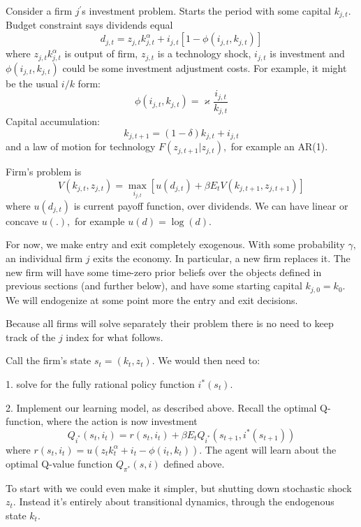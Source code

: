 \documentclass[12pt]{article}%
\begin{document}
Consider a firm $j^{\prime}$s investment problem. Starts the period with some
capital $k_{j,t}.$ Budget constraint says dividends equal
\[
d_{j,t}=z_{j,t}k_{j,t}^{\alpha}+i_{j,t}\left[  1-\phi(i_{j,t},k_{j,t})\right]
\]
where $z_{j,t}k_{j,t}^{\alpha}$ is output of firm, $z_{j,t}$ is a technology
shock,  $i_{j,t}$ is investment and $\phi(i_{j,t},k_{j,t})$ could be some
investment adjustment costs. For example, it might be the usual $i/k$ form:%
\[
\phi(i_{j,t},k_{j,t})=\varkappa\frac{i_{j,t}}{k_{j,t}}%
\]
Capital accumulation:
\[
k_{j,t+1}=(1-\delta)k_{j,t}+i_{j,t}%
\]
and a law of motion for technology $F(z_{j,t+1}|z_{j,t}),$ for example an
AR(1). 

Firm's problem is
\[
V(k_{j,t},z_{j,t})=\max_{i_{j,t}}\left[  u(d_{j,t})+\beta E_{t}V(k_{j,t+1}%
,z_{j,t+1})\right]
\]
where $u(d_{j,t})$ is current payoff function, over dividends. We can have
linear or concave $u(.),$ for example $u(d)=\log(d).$

For now, we make entry and exit completely exogenous. With some probability
$\gamma,$ an individual firm $j$ exits the economy. In particular, a new firm
replaces it. The new firm will have some time-zero prior beliefs over the
objects defined in previous sections (and further below), and have some
starting capital $k_{j,0}=k_{0}.$ We will endogenize at some point more the
entry and exit decisions. 

Because all firms will solve separately their problem there is no need to keep
track of the $j$ index for what follows. 

Call the firm's state $s_{t}=\left(  k_{t},z_{t}\right)  .$ We would then need
to: 

1. solve for the fully rational policy function $i^{\ast}(s_{t}).$ 

2. Implement our learning model, as described above. Recall the optimal
Q-function, where the action is now investment
\[
Q_{i^{\ast}}(s_{t},i_{t})=r(s_{t},i_{t})+\beta E_{t}Q_{i^{\ast}}%
(s_{t+1},i^{\ast}(s_{t+1}))
\]
where $r(s_{t},i_{t})=u\left(  z_{t}k_{t}^{\alpha}+i_{t}-\phi(i_{t}%
,k_{t})\right)  .$ The agent will learn about the optimal Q-value function
$Q_{\pi^{\ast}}(s,i)$ defined above.

\bigskip

To start with we could even make it simpler, but shutting down stochastic
shock $z_{t}.$ Instead it's entirely about transitional dynamics, through the
endogenous state $k_{t}.$
\end{document}
